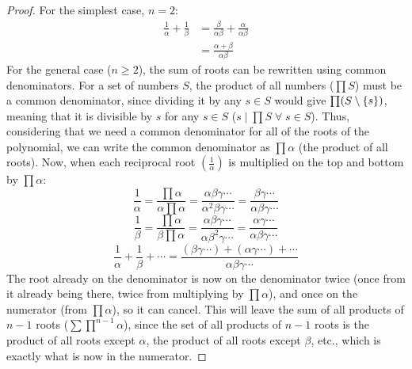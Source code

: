        \begin{proof}
            For the simplest case, $n=2$:
            \begin{equation*}
                \begin{aligned}
                    \frac{1}{\alpha}+\frac{1}{\beta}&=\frac{\beta}{\alpha\beta}+\frac{\alpha}{\alpha\beta} \\
                    &=\frac{\alpha+\beta}{\alpha\beta}
                \end{aligned}
            \end{equation*}
            For the general case ($n\ge2$), the sum of \glspl{root} can be rewritten using common denominators.
            For a set of numbers $S$, the product of all numbers ($\prod S$) must be a common denominator, since dividing it by any $s\in S$ would give $\prod(S\setminus{\left\{s\right\}})$, meaning that it is divisible by $s$ for any $s\in S$ ($s\mid\prod S\;\forall\;s\in S$).
            Thus, considering that we need a common denominator for all of the \glspl{root} of the \gls{polynomial}, we can write the common denominator as $\prod\alpha$ (the product of all \glspl{root}).
            Now, when each \gls{reciprocal} \gls{root} $\left(\frac{1}{\alpha}\right)$ is multiplied on the top and bottom by $\prod\alpha$:
            \begin{equation}
                \frac{1}{\alpha}=\frac{\prod\alpha}{\alpha\prod\alpha}=\frac{\alpha\beta\gamma\cdots}{\alpha^2\beta\gamma\cdots}=\frac{\beta\gamma\cdots}{\alpha\beta\gamma\cdots}
            \end{equation}
            \begin{equation}
                \frac{1}{\beta}=\frac{\prod\alpha}{\beta\prod\alpha}=\frac{\alpha\beta\gamma\cdots}{\alpha\beta^2\gamma\cdots}=\frac{\alpha\gamma\cdots}{\alpha\beta\gamma\cdots}
            \end{equation}
            \begin{equation}
                \frac{1}{\alpha}+\frac{1}{\beta}+\cdots=\frac{(\beta\gamma\cdots)+(\alpha\gamma\cdots)+\cdots}{\alpha\beta\gamma\cdots}
            \end{equation}
            The root already on the denominator is now on the denominator twice (once from it already being there, twice from multiplying by $\prod\alpha$), and once on the numerator (from $\prod\alpha$), so it can cancel.
            This will leave the sum of all products of $n-1$ \glspl{root} ($\sum\prod^{n-1}\alpha$), since the set of all products of $n-1$ \glspl{root} is the product of all \glspl{root} except $\alpha$, the product of all \glspl{root} except $\beta$, etc., which is exactly what is now in the numerator.
        \end{proof}

